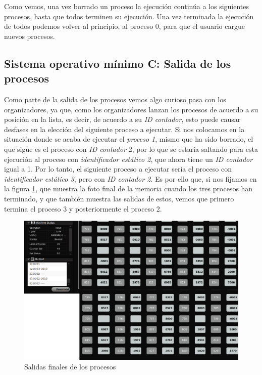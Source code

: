 \documentclass[letterpaper,12pt,oneside]{book}
\begin{document}
		Como vemos, una vez borrado un proceso la ejecución continúa a los siguientes procesos, hasta que todos terminen su ejecución. Una vez
		terminada la ejecución de todos podemos volver al principio, al proceso 0, para que el usuario cargue nuevos procesos.
		
		\subsection{Sistema operativo mínimo C: Salida de los procesos}		
		
		Como parte de la salida de los procesos vemos 
		algo curioso pasa con los organizadores, ya que, como  los organizadores lanzan los procesos de acuerdo a su posición en la lista, es decir,
		de acuerdo a su \textit{ID contador}, esto puede causar desfases en la elección del siguiente proceso a ejecutar. 
		Si nos colocamos en la situación donde se acaba de ejecutar el \textit{proceso 1}, mismo que ha sido borrado, el que sigue es el proceso
		con \textit{ID contador} 2, por lo que se estaría saltando para esta ejecución al proceso 
		con \textit{identificador estático 2}, que ahora tiene un \textit{ID contador} igual a
		1. Por lo tanto, el siguiente proceso a ejecutar sería el proceso con \textit{identificador estático 3}, pero con \textit{ID contador 2}.
		Es por ello que, si nos fijamos en la figura \ref{fig:FinalProcesos}, que muestra
		la foto final de la memoria cuando los tres procesos han terminado, y que también muestra las salidas de estos, vemos que
		primero termina el proceso 3 y posteriormente  el proceso 2.
		
		\begin{figure}[h]		
			\centering
			\includegraphics[scale=0.51]{media/CARDIACC/FinalProcesos_cut.png}
			\caption{ Salidas finales de los procesos}
			\label{fig:FinalProcesos}
		\end{figure}
		
\end{document}
